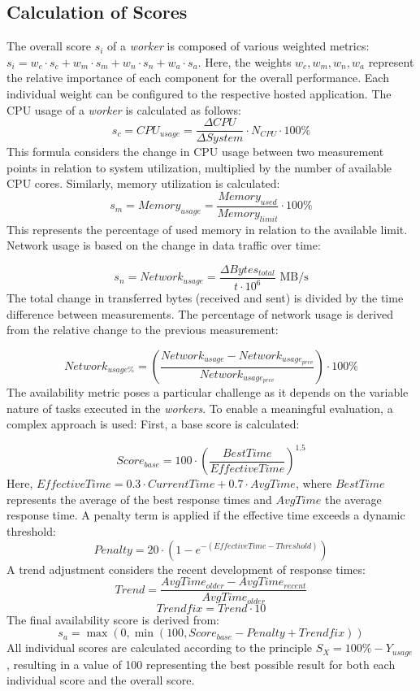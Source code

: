 \documentclass[twocolumn]{webofc}
\begin{document}
    \newpage
    \subsection{Calculation of Scores}

    The overall score \( s_i \) of a \textit{worker} is composed of various weighted metrics: $s_i = w_c \cdot s_c + w_m \cdot s_m + w_n \cdot s_n + w_a \cdot s_a$. Here, the weights \( w_c, w_m, w_n, w_a \) represent the relative importance of each component for the overall performance. Each individual weight can be configured to the respective hosted application. The CPU usage of a \textit{worker} is calculated as follows:
    $$s_c = CPU_{usage} = \frac{\Delta CPU}{\Delta System} \cdot N_{CPU} \cdot 100\%$$
    This formula considers the change in CPU usage between two measurement points in relation to system utilization, multiplied by the number of available CPU cores. Similarly, memory utilization is calculated:
    $$s_m =Memory_{usage} = \frac{Memory_{used}}{Memory_{limit}} \cdot 100\%$$
    This represents the percentage of used memory in relation to the available limit. Network usage is based on the change in data traffic over time:

    $$s_n = Network_{usage} = \frac{\Delta Bytes_{total}}{t \cdot 10^6} \text{ MB/s}$$
    The total change in transferred bytes (received and sent) is divided by the time difference between measurements. The percentage of network usage is derived from the relative change to the previous measurement:

    $$Network_{usage\%} = \left(\frac{Network_{usage} - Network_{usage_{prev}}}{Network_{usage_{prev}}}\right) \cdot 100\%$$
    The availability metric poses a particular challenge as it depends on the variable nature of tasks executed in the \textit{workers}. To enable a meaningful evaluation, a complex approach is used: First, a base score is calculated:

    $$Score_{base} = 100 \cdot \left(\frac{BestTime}{EffectiveTime}\right)^{1.5}$$
    Here, \( EffectiveTime = 0.3 \cdot CurrentTime + 0.7 \cdot AvgTime \), where \( BestTime \) represents the average of the best response times and \( AvgTime \) the average response time. A penalty term is applied if the effective time exceeds a dynamic threshold:
    $$Penalty = 20 \cdot (1 - e^{-(EffectiveTime - Threshold)})$$ A trend adjustment considers the recent development of response times:
    $$Trend = \frac{AvgTime_{older} - AvgTime_{recent}}{AvgTime_{older}}$$
    $$Trendfix = Trend \cdot 10$$
    The final availability score is derived from:
    $$s_a = \max(0, \min(100, Score_{base} - Penalty + Trendfix))$$
    All individual scores are calculated according to the principle \( S_X = 100\% - Y_{usage} \), resulting in a value of 100 representing the best possible result for both each individual score and the overall score.
\end{document}

